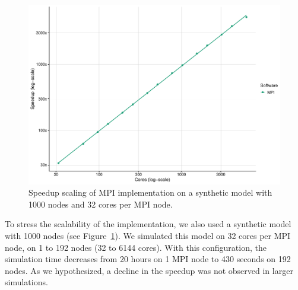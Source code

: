 \documentclass[times, twoside]{zHenriquesLab-StyleBioRxiv}
\begin{document}
\begin{figure}%
\centering
\includegraphics[width=.8\linewidth]{Figures/synth_mpi_speedup.pdf}
\caption{Speedup scaling of MPI implementation on a synthetic model with 1000 nodes and 32 cores per MPI node.}
\label{fig:synthetic_results}
\end{figure}

To stress the scalability of the implementation, we also used a synthetic model with 1000 nodes (see Figure~\ref{fig:synthetic_results}). We simulated this model on 32 cores per MPI node, on 1 to 192 nodes (32 to 6144 cores). With this configuration, the simulation time decreases from 20 hours on 1 MPI node to 430 seconds on 192 nodes. As we hypothesized, a decline in the speedup was not observed in larger simulations. 



\end{document}
